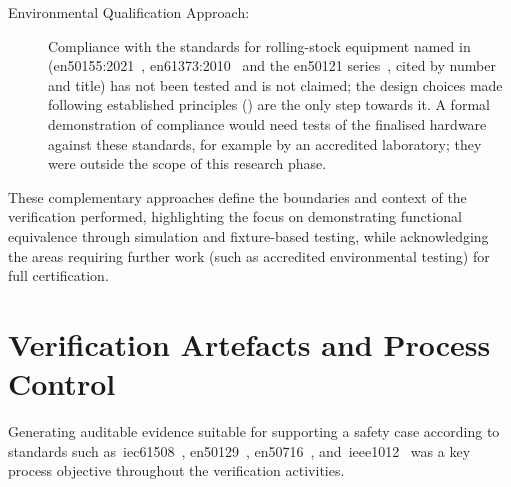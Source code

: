 \begin{description}
	\item[Environmental Qualification Approach:] Compliance with the standards for rolling-stock equipment named in  (\gls{en50155}:2021~\cite{en50155_2021}, \gls{en61373}:2010~\cite{en61373_2010} and the \gls{en50121} series~\cite{en50121_3_2_2016}, cited by number and title) has not been tested and is not claimed; the design choices made following established principles () are the only step towards it. A formal demonstration of compliance would need tests of the finalised hardware against these standards, for example by an accredited laboratory; they were outside the scope of this research phase.
\end{description}
These complementary approaches define the boundaries and context of the verification performed, highlighting the focus on demonstrating functional equivalence through simulation and fixture-based testing, while acknowledging the areas requiring further work (such as accredited environmental testing) for full certification.

\section{Verification Artefacts and Process Control}
\label{sec:verification_artefacts}

Generating auditable evidence suitable for supporting a safety case according to standards such as~\gls{iec61508}~\cite{iec61508_2010}, \gls{en50129}~\cite{en50129_2018}, \gls{en50716}~\cite{en50716_2023}, and~\gls{ieee1012}~\cite{ieee1012_2024} was a key process objective throughout the verification activities.

